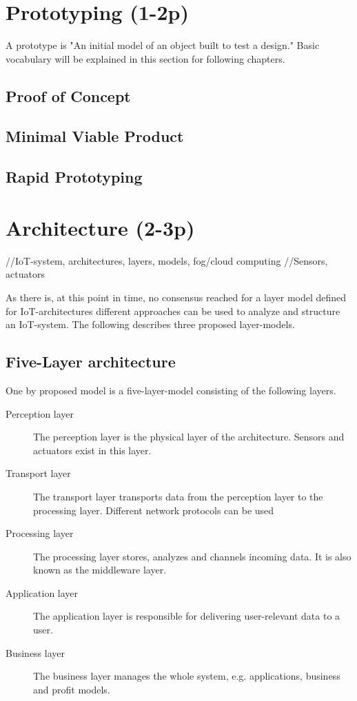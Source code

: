\section{Prototyping (1-2p)}
A prototype is "An initial model of an object built to test a design." \parencite{prototypeDef}
Basic vocabulary will be explained in this section for following chapters.

\subsection{Proof of Concept}
\subsection{Minimal Viable Product}
\subsection{Rapid Prototyping}


\section{Architecture (2-3p)}
//IoT-system, architectures, layers, models, fog/cloud computing //Sensors, actuators

As there is, at this point in time, no consensus reached for a layer model defined for IoT-architectures \parencite{noModel}
different approaches can be used to analyze and structure an IoT-system. 
The following describes three proposed layer-models.

\subsection{Five-Layer architecture}
One by \parencite{fiveLayer1,fiveLayer} proposed model is a five-layer-model consisting of the following layers.
\begin{description}
    \item [Perception layer]
    The perception layer is the physical layer of the architecture. Sensors and actuators exist in this layer.
    \item [Transport layer]
     The transport layer transports data from the perception layer to the processing layer. Different network protocols can be used
   \item [Processing layer]
   The processing layer stores, analyzes and channels incoming data. It is also known as the middleware layer.
   \item [Application layer]
   The application layer is responsible for delivering user-relevant data to a user.
   \item [Business layer]
   The business layer manages the whole system, e.g. applications, business and profit models.
\end{description}

